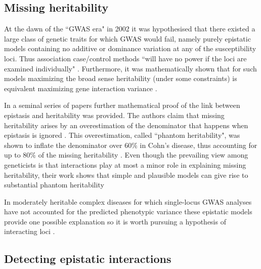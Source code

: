 \subsection{Missing heritability}

At the dawn of the ``GWAS era" in 2002 it was hypothesised that there existed a large class of genetic traits for which GWAS would fail, namely purely epistatic models containing no additive or dominance variation at any of the susceptibility loci. 
Thus association case/control methods ``will have no power if the loci are examined individually" \cite{culverhouse2002perspective}.
Furthermore, it was mathematically shown that for such models maximizing the broad sense heritability (under some constraints) is equivalent maximizing gene interaction variance \cite{culverhouse2002perspective}.

In a seminal series of papers \cite{zuk2012mystery, zuk2014searching} further mathematical proof of the link between epistasis and heritability was provided.
The authors claim that missing heritability arises by an overestimation of the denominator that happens when epistasis is ignored \cite{zuk2012mystery}.
This overestimation, called ``phantom heritability", was shown to inflate the denominator over $60\%$ in Cohn's disease, thus accounting for up to $80\%$ of the missing heritability \cite{zuk2012mystery}.
Even though the prevailing view among geneticists is that interactions play at most a minor role in explaining missing heritability, their work shows that simple and plausible models can give rise to substantial phantom heritability \cite{zuk2012mystery}

In moderately heritable complex diseases for which single-locus GWAS analyses have not accounted for the predicted phenotypic variance these epistatic models provide one possible explanation so it is worth pursuing a hypothesis of interacting loci \cite{culverhouse2002perspective}.

\subsection{Detecting epistatic interactions}

